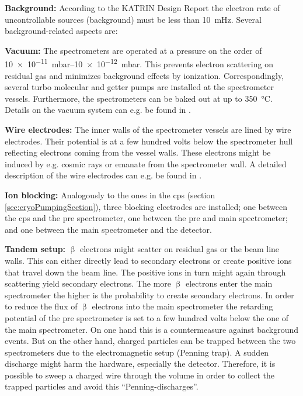 {\par \textbf{Background:} According to the KATRIN Design Report \cite{Angrik:2005ep} the electron rate of uncontrollable sources (background) must be less than \SI{10}{mHz}. Several background-related aspects are:}

{\par \textbf{Vacuum:} The spectrometers are operated at a pressure on the order of \SIrange{10e-11}{10e-12}{mbar}. This prevents electron scattering on residual gas and minimizes background effects by ionization. Correspondingly, several turbo molecular and getter pumps are installed at the spectrometer vessels. Furthermore, the spectrometers can be baked out at up to \SI{350}{\celsius}. Details on the vacuum system can e.g. be found in \cite{Arenz2016}.}

{\par \textbf{Wire electrodes:} The inner walls of the spectrometer vessels are lined by wire electrodes. Their potential is at a few hundred volts below the spectrometer hull reflecting electrons coming from the vessel walls. These electrons might be induced by e.g. cosmic rays or emanate from the spectrometer wall. A detailed description of the wire electrodes can e.g. be found in \cite{Valerius2009}.}

{\par \textbf{Ion blocking:} Analogously to the ones in the \gls{cps} (section \ref{sec:cryoPumpingSection}), three blocking electrodes are installed; one between the \gls{cps} and the pre spectrometer, one between the pre and main spectrometer; and one between the main spectrometer and the detector.}

{\par \textbf{Tandem setup:} $\upbeta$ electrons might scatter on residual gas or the beam line walls. This can either directly lead to secondary electrons or create positive ions that travel down the beam line. The positive ions in turn might again through scattering yield secondary electrons. The more $\upbeta$ electrons enter the main spectrometer the higher is the probability to create secondary electrons. In order to reduce the flux of $\upbeta$ electrons into the main spectrometer the retarding potential of the pre spectrometer is set to a few hundred volts below the one of the main spectrometer. On one hand this is a countermeasure against background events. But on the other hand, charged particles can be trapped between the two spectrometers due to the electromagnetic setup (Penning trap). A sudden discharge might harm the hardware, especially the detector. Therefore, it is possible to sweep a charged wire through the volume in order to collect the trapped particles and avoid this ``Penning-discharges''.}

